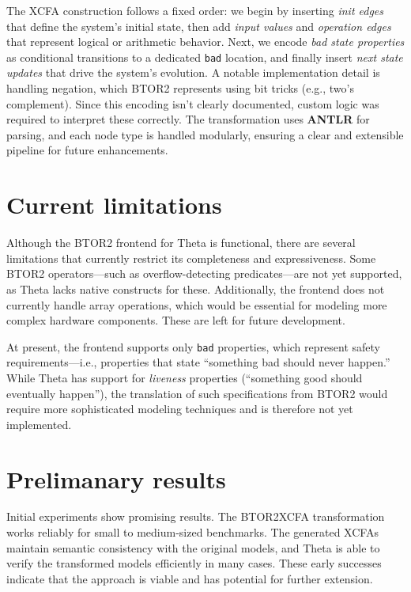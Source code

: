 The XCFA construction follows a fixed order: we begin by inserting \textit{init edges} that define the system's initial state, then add \textit{input values} and \textit{operation edges} that represent logical or arithmetic behavior. Next, we encode \textit{bad state properties} as conditional transitions to a dedicated \verb*|bad| location, and finally insert \textit{next state updates} that drive the system's evolution. A notable implementation detail is handling negation, which BTOR2 represents using bit tricks (e.g., two's complement). Since this encoding isn't clearly documented, custom logic was required to interpret these correctly. The transformation uses \textbf{ANTLR} for parsing, and each node type is handled modularly, ensuring a clear and extensible pipeline for future enhancements.\cite{antlr}

\section{Current limitations}
Although the BTOR2 frontend for Theta is functional, there are several limitations that currently restrict its completeness and expressiveness. Some BTOR2 operators—such as overflow-detecting predicates—are not yet supported, as Theta lacks native constructs for these. Additionally, the frontend does not currently handle array operations, which would be essential for modeling more complex hardware components. These are left for future development.

At present, the frontend supports only \texttt{bad} properties, which represent safety requirements—i.e., properties that state ``something bad should never happen.'' While Theta has support for \emph{liveness} properties (``something good should eventually happen''), the translation of such specifications from BTOR2 would require more sophisticated modeling techniques and is therefore not yet implemented.
 
\section{Prelimanary results}
Initial experiments show promising results. The BTOR2XCFA transformation works reliably for small to medium-sized benchmarks. The generated XCFAs maintain semantic consistency with the original models, and Theta is able to verify the transformed models efficiently in many cases. These early successes indicate that the approach is viable and has potential for further extension.

